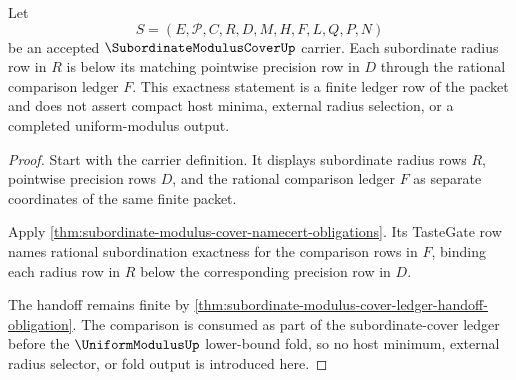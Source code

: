 \begin{theorem}
\label{thm:subordinate-modulus-cover-rational-subordination-exactness}
Let
$$
S=(E,\mathcal{P},C,R,D,M,H,F,L,Q,P,N)
$$
be an accepted $\SubordinateModulusCoverUp$ carrier. Each subordinate radius row in $R$ is below its matching pointwise precision row in $D$ through the rational comparison ledger $F$. This exactness statement is a finite ledger row of the packet and does not assert compact host minima, external radius selection, or a completed uniform-modulus output.
\end{theorem}
\begin{proof}
Start with the carrier definition. It displays subordinate radius rows $R$, pointwise precision rows $D$, and the rational comparison ledger $F$ as separate coordinates of the same finite packet.

Apply \autoref{thm:subordinate-modulus-cover-namecert-obligations}. Its TasteGate row names rational subordination exactness for the comparison rows in $F$, binding each radius row in $R$ below the corresponding precision row in $D$.

The handoff remains finite by \autoref{thm:subordinate-modulus-cover-ledger-handoff-obligation}. The comparison is consumed as part of the subordinate-cover ledger before the $\UniformModulusUp$ lower-bound fold, so no host minimum, external radius selector, or fold output is introduced here.
\end{proof}

